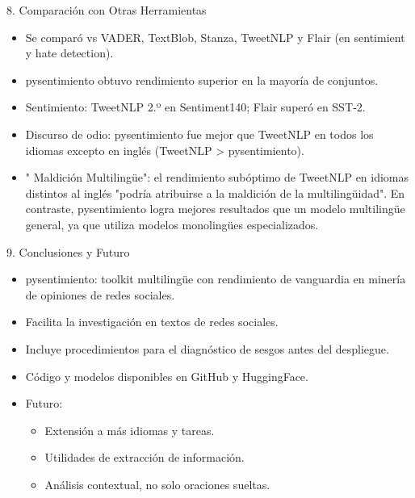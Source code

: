 \documentclass{beamer}
\begin{document}
\begin{frame}{8. Comparación con Otras Herramientas}
  \begin{itemize}
    \item Se comparó vs VADER, TextBlob, Stanza, TweetNLP y Flair (en sentimient y hate detection).
    \item pysentimiento obtuvo rendimiento superior en la mayoría de conjuntos.
    \item Sentimiento: TweetNLP 2.º en Sentiment140; Flair superó en SST‑2.
    \item Discurso de odio: pysentimiento fue mejor que TweetNLP en todos los idiomas excepto en inglés (TweetNLP > pysentimiento).
    \item " Maldición Multilingüe": el rendimiento subóptimo de TweetNLP en idiomas distintos al inglés "podría atribuirse a la maldición de la multilingüidad". 
    En contraste, pysentimiento logra mejores resultados que un modelo multilingüe general, ya que utiliza modelos monolingües especializados. 
  \end{itemize}
\end{frame}

\begin{frame}{9. Conclusiones y Futuro}
  \begin{itemize}
    \item pysentimiento: toolkit multilingüe con rendimiento de vanguardia en minería de opiniones de redes sociales.
    \item Facilita la investigación en textos de redes sociales.
    \item Incluye procedimientos para el diagnóstico de sesgos antes del despliegue.
    \item Código y modelos disponibles en GitHub y HuggingFace.
    \item Futuro:
      \begin{itemize}
        \item Extensión a más idiomas y tareas.
        \item Utilidades de extracción de información.
        \item Análisis contextual, no solo oraciones sueltas.
      \end{itemize}
  \end{itemize}
\end{frame}
\end{document}
